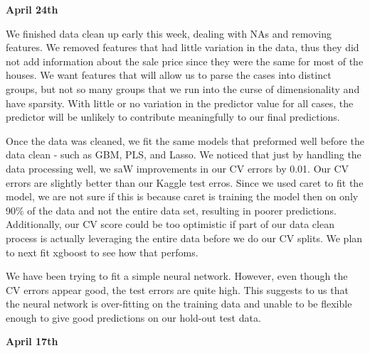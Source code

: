\documentclass[12pt]{article}
\newcommand{\myfont}{\fontfamily{pcr}\selectfont}
\begin{document}
\textbf{April 24th}

We finished data clean up early this week, dealing with NAs and removing features.  We removed features that had little variation in the data, thus they did not add information about the sale price since they were the same for most of the houses.  We want features that will allow us to parse the cases into distinct groups, but not so many groups that we run into the curse of dimensionality and have sparsity.  With little or no variation in the predictor value for all cases, the predictor will be unlikely to contribute meaningfully to our final predictions.

Once the data was cleaned, we fit the same models that preformed well before the data clean - such as GBM, PLS, and Lasso.  We noticed that just by handling the data processing well, we saW improvements in our CV errors by 0.01.  Our CV errors are slightly better than our Kaggle test erros.  Since we used {\myfont caret} to fit the model, we are not sure if this is because {\myfont caret} is training the model then on only 90\% of the data and not the entire data set, resulting in poorer predictions.  Additionally, our CV score could be too optimistic if part of our data clean process is actually leveraging the entire data before we do our CV splits.  We plan to next fit xgboost to see how that perfoms.

We have been trying to fit a simple neural network.  However, even though the CV errors appear good, the test errors are quite high.  This suggests to us that the neural network is over-fitting on the training data and unable to be flexible enough to give good predictions on our hold-out test data.




\textbf{April 17th}
\end{document}
